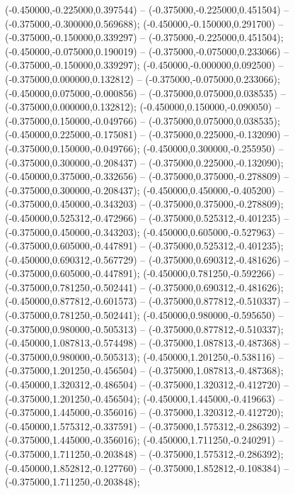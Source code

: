  (-0.450000,-0.225000,0.397544) -- (-0.375000,-0.225000,0.451504) -- (-0.375000,-0.300000,0.569688);
 (-0.450000,-0.150000,0.291700) -- (-0.375000,-0.150000,0.339297) -- (-0.375000,-0.225000,0.451504);
 (-0.450000,-0.075000,0.190019) -- (-0.375000,-0.075000,0.233066) -- (-0.375000,-0.150000,0.339297);
 (-0.450000,-0.000000,0.092500) -- (-0.375000,0.000000,0.132812) -- (-0.375000,-0.075000,0.233066);
 (-0.450000,0.075000,-0.000856) -- (-0.375000,0.075000,0.038535) -- (-0.375000,0.000000,0.132812);
 (-0.450000,0.150000,-0.090050) -- (-0.375000,0.150000,-0.049766) -- (-0.375000,0.075000,0.038535);
 (-0.450000,0.225000,-0.175081) -- (-0.375000,0.225000,-0.132090) -- (-0.375000,0.150000,-0.049766);
 (-0.450000,0.300000,-0.255950) -- (-0.375000,0.300000,-0.208437) -- (-0.375000,0.225000,-0.132090);
 (-0.450000,0.375000,-0.332656) -- (-0.375000,0.375000,-0.278809) -- (-0.375000,0.300000,-0.208437);
 (-0.450000,0.450000,-0.405200) -- (-0.375000,0.450000,-0.343203) -- (-0.375000,0.375000,-0.278809);
 (-0.450000,0.525312,-0.472966) -- (-0.375000,0.525312,-0.401235) -- (-0.375000,0.450000,-0.343203);
 (-0.450000,0.605000,-0.527963) -- (-0.375000,0.605000,-0.447891) -- (-0.375000,0.525312,-0.401235);
 (-0.450000,0.690312,-0.567729) -- (-0.375000,0.690312,-0.481626) -- (-0.375000,0.605000,-0.447891);
 (-0.450000,0.781250,-0.592266) -- (-0.375000,0.781250,-0.502441) -- (-0.375000,0.690312,-0.481626);
 (-0.450000,0.877812,-0.601573) -- (-0.375000,0.877812,-0.510337) -- (-0.375000,0.781250,-0.502441);
 (-0.450000,0.980000,-0.595650) -- (-0.375000,0.980000,-0.505313) -- (-0.375000,0.877812,-0.510337);
 (-0.450000,1.087813,-0.574498) -- (-0.375000,1.087813,-0.487368) -- (-0.375000,0.980000,-0.505313);
 (-0.450000,1.201250,-0.538116) -- (-0.375000,1.201250,-0.456504) -- (-0.375000,1.087813,-0.487368);
 (-0.450000,1.320312,-0.486504) -- (-0.375000,1.320312,-0.412720) -- (-0.375000,1.201250,-0.456504);
 (-0.450000,1.445000,-0.419663) -- (-0.375000,1.445000,-0.356016) -- (-0.375000,1.320312,-0.412720);
 (-0.450000,1.575312,-0.337591) -- (-0.375000,1.575312,-0.286392) -- (-0.375000,1.445000,-0.356016);
 (-0.450000,1.711250,-0.240291) -- (-0.375000,1.711250,-0.203848) -- (-0.375000,1.575312,-0.286392);
 (-0.450000,1.852812,-0.127760) -- (-0.375000,1.852812,-0.108384) -- (-0.375000,1.711250,-0.203848);
